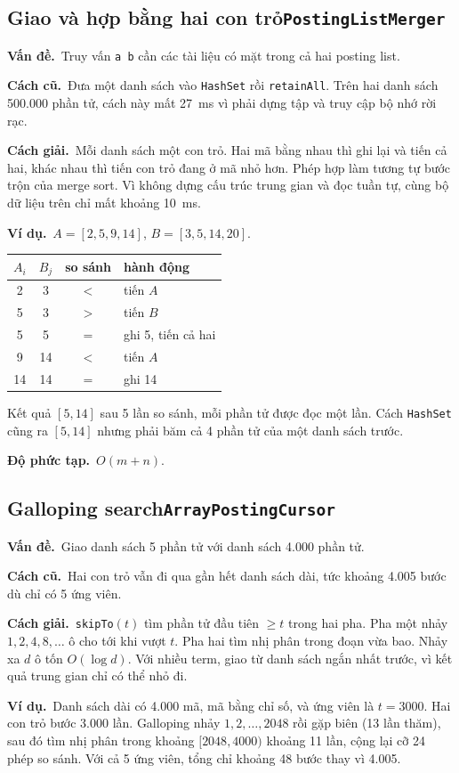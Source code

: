 \documentclass[9pt,twocolumn,a4paper]{extarticle}
\newcommand{\code}[1]{\texttt{#1}}
\newcommand{\dsa}[2]{\subsection[#1]{#1\hfill{\normalfont\footnotesize\code{#2}}}}
\newcommand{\vande}{\textcolor{linkblue}{\textbf{Vấn đề.}}~}
\newcommand{\cachgiai}{\textcolor{linkblue}{\textbf{Cách giải.}}~}
\newcommand{\dpt}{\textcolor{linkblue}{\textbf{Độ phức tạp.}}~}
\newcommand{\cu}{\textcolor{linkblue}{\textbf{Cách cũ.}}~}
\newcommand{\vidu}{\textcolor{linkblue}{\textbf{Ví dụ.}}~}
\begin{document}
\dsa{Giao và hợp bằng hai con trỏ}{PostingListMerger}
\vande Truy vấn \code{a b} cần các tài liệu có mặt trong cả hai posting list.

\cu Đưa một danh sách vào \code{HashSet} rồi \code{retainAll}. Trên hai danh sách 500.000 phần tử, cách này mất 27~ms vì phải dựng tập và truy cập bộ nhớ rời rạc.

\cachgiai Mỗi danh sách một con trỏ. Hai mã bằng nhau thì ghi lại và tiến cả hai, khác nhau thì tiến con trỏ đang ở mã nhỏ hơn. Phép hợp làm tương tự bước trộn của merge sort. Vì không dựng cấu trúc trung gian và đọc tuần tự, cùng bộ dữ liệu trên chỉ mất khoảng 10~ms.

\vidu $A=[2,5,9,14]$, $B=[3,5,14,20]$.
\begin{center}
\footnotesize
\begin{tabular}{@{}cccl@{}}
\toprule
$A_i$ & $B_j$ & so sánh & hành động \\
\midrule
2 & 3 & $<$ & tiến $A$ \\
5 & 3 & $>$ & tiến $B$ \\
5 & 5 & $=$ & ghi 5, tiến cả hai \\
9 & 14 & $<$ & tiến $A$ \\
14 & 14 & $=$ & ghi 14 \\
\bottomrule
\end{tabular}
\end{center}
Kết quả $[5,14]$ sau 5 lần so sánh, mỗi phần tử được đọc một lần. Cách \code{HashSet} cũng ra $[5,14]$ nhưng phải băm cả 4 phần tử của một danh sách trước.

\dpt $O(m+n)$.

\dsa{Galloping search}{ArrayPostingCursor}
\vande Giao danh sách 5 phần tử với danh sách 4.000 phần tử.

\cu Hai con trỏ vẫn đi qua gần hết danh sách dài, tức khoảng 4.005 bước dù chỉ có 5 ứng viên.

\cachgiai \code{skipTo}$(t)$ tìm phần tử đầu tiên $\ge t$ trong hai pha. Pha một nhảy $1,2,4,8,\dots$ ô cho tới khi vượt $t$. Pha hai tìm nhị phân trong đoạn vừa bao. Nhảy xa $d$ ô tốn $O(\log d)$. Với nhiều term, giao từ danh sách ngắn nhất trước, vì kết quả trung gian chỉ có thể nhỏ đi.

\vidu Danh sách dài có 4.000 mã, mã bằng chỉ số, và ứng viên là $t=3000$. Hai con trỏ bước 3.000 lần. Galloping nhảy $1,2,\dots,2048$ rồi gặp biên (13 lần thăm), sau đó tìm nhị phân trong khoảng $[2048,4000)$ khoảng 11 lần, cộng lại cỡ 24 phép so sánh. Với cả 5 ứng viên, tổng chỉ khoảng 48 bước thay vì 4.005.
\end{document}
